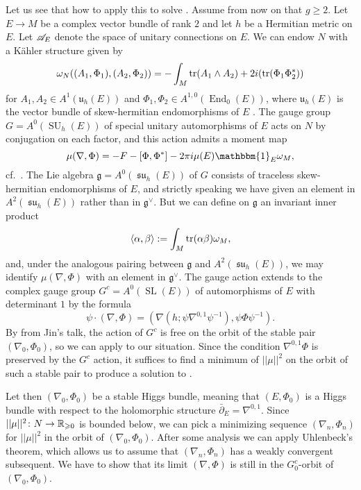 \documentclass[A4paper, 12pt, british, reqno]{amsart}
\DeclareMathOperator{\End}{End}
\DeclareMathOperator{\tr}{tr}
\DeclareMathOperator{\SU}{SU}
\DeclareMathOperator{\SL}{SL}
\DeclareMathOperator{\su}{\mathfrak{su}}
\let\Im\relax
\DeclareMathOperator{\Im}{Im}
\newcommand{\dual}{^{\vee}}
\newcommand{\g}{\mathfrak{g}}
\renewcommand{\u}{\mathfrak{u}}
\newcommand{\1}{\mathbbm{1}}
\begin{document}
Let us see that how to apply this to solve .
Assume from now on that $g\geqslant 2$.
Let $E\to M$ be a complex vector bundle of rank $2$ and let $h$ be a Hermitian metric on $E$.
Let $\mathscr{A}_{E}$ denote the space of unitary connections on $E$.
We can endow $N$ with a Kähler structure given by
\[ \w_{N}((A_{1},\Phi_{1}),(A_{2},\Phi_{2}))=-\int_{M}\tr(A_{1}\wedge A_{2})+2i\Im(\tr(\Phi_{1}\Phi_{2}^{*})) \]
for $A_{1},A_{2}\in A^{1}(\u_{h}(E))$ and $\Phi_{1},\Phi_{2}\in A^{1,0}(\End_{0}(E))$, where $\u_{h}(E)$ is the vector bundle of skew-hermitian endomorphisms of $E$ \cite[Corollary 4.2.11]{huy05}.
The gauge group $G=A^{0}(\SU_{h}(E))$ of special unitary automorphisms of $E$ acts on $N$ by conjugation on each factor, and this action admits a moment map
\[ \mu(\nabla,\Phi)=-F-[\Phi,\Phi^{*}]-2\pi i \mu(E)\1_{E}\w_{M}, \]
cf.~\cite[Proposition III.3.2]{gal19}.
The Lie algebra $\g=A^{0}(\su_{h}(E))$ of $G$ consists of traceless skew-hermitian endomorphisms of $E$, and strictly speaking we have given an element in $A^{2}(\su_{h}(E))$ rather than in $\g\dual$.
But we can define on $\g$ an invariant inner product
\[ \langle\alpha,\beta\rangle:=\int_{M}\tr(\alpha\beta)\w_{M}, \]
and, under the analogous pairing between $\g$ and $A^{2}(\su_{h}(E))$, we may identify $\mu(\nabla,\Phi)$ with an element in $\g\dual$.
The gauge action extends to the complex gauge group $G^{c}=A^{0}(\SL(E))$ of automorphisms of $E$ with determinant $1$ by the formula
\[ \psi\cdot (\nabla,\Phi)=(\nabla(h;\psi\nabla^{0,1}\psi^{-1}),\psi\Phi \psi^{-1}). \]
By \cite[(3.15)]{hit87a} from Jin's talk, the action of $G^{c}$ is free on the orbit of the stable pair $(\nabla_{0},\Phi_{0})$, so we can apply  to our situation.
Since the condition $\nabla^{0,1}\Phi$ is preserved by the $G^{c}$ action, it suffices to find a minimum of $||\mu||^{2}$ on the orbit of such a stable pair to produce a solution to .

Let then $(\nabla_{0},\Phi_{0})$ be a stable Higgs bundle, meaning that $(E,\Phi_{0})$ is a Higgs bundle with respect to the holomorphic structure $\bar{\partial}_{E}=\nabla^{0,1}$.
Since $||\mu||^{2}\colon N\to \mathbb{R}_{\geqslant 0}$ is bounded below, we can pick a minimizing sequence $(\nabla_{n},\Phi_{n})$ for $||\mu||^{2}$ in the orbit of $(\nabla_{0},\Phi_{0})$.
After some analysis \cite[pp.~80-81]{hit87a} we can apply Uhlenbeck's theorem, which allows us to assume that $(\nabla_{n},\Phi_{n})$ has a weakly convergent subsequent.
We have to show that its limit $(\nabla,\Phi)$ is still in the $G^{c}_{0}$-orbit of $(\nabla_{0},\Phi_{0})$.
\end{document}
